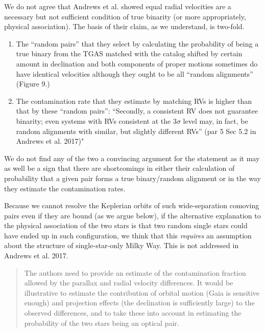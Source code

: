 \documentclass[12pt]{article}
\begin{document}
We do not agree that Andrews et al. showed equal radial velocities are a
necessary but not sufficient condition of true binarity (or more
appropriately, physical association). The basis of their claim, as we
understand, is two-fold.

\begin{enumerate}
\def\labelenumi{\arabic{enumi}.}
\itemsep1pt\parskip0pt
\item
  The ``random pairs'' that they select by calculating the
  probability of being a true binary from the TGAS matched with the
  catalog shifted by certain amount in declination and both components
  of proper motions sometimes do have identical velocities although they
  ought to be all ``random alignments'' (Figure 9.)
\item
  The contamination rate that they estimate by matching RVs is higher
  than that by these ``random pairs'': ``Secondly, a consistent RV does
  not guarantee binarity; even systems with RVs consistent at the
  $3\sigma$ level may, in fact, be random alignments with similar, but
  slightly different RVs'' (par 5 Sec 5.2 in Andrews et al. 2017)"
\end{enumerate}

We do not find any of the two a convincing argument for the statement
as it may as well be a sign that there are shortcomings in
either their calculation of probability that a given pair forms a true
binary/random alignment or in the way they estimate the contamination
rates.

Because we cannot resolve the Keplerian orbits of such wide-separation comoving
pairs even if they are bound (as we argue below), if the alternative explanation
to the physical association of the two stars is that two random single stars
could have ended up in such configuration, we think that this \emph{requires} an
assumption about the structure of single-star-only Milky Way. This is not
addressed in Andrews et al. 2017.


\begin{quote}
The authors need to provide an estimate of the contamination fraction
allowed by the parallax and radial velocity differences. It would be
illustrative to estimate the contribution of orbital motion (Gaia is
sensitive enough) and projection effects (the declination is
sufficiently large) to the observed differences, and to take these into
account in estimating the probability of the two stars being an optical
pair.
\end{quote}
\end{document}
